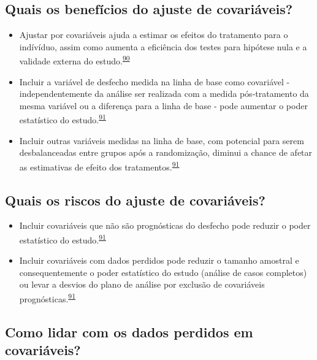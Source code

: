 \documentclass[
]{book}
\begin{document}
\hypertarget{quais-os-benefuxedcios-do-ajuste-de-covariuxe1veis}{%
\subsection{Quais os benefícios do ajuste de covariáveis?}\label{quais-os-benefuxedcios-do-ajuste-de-covariuxe1veis}}

\begin{itemize}
\item
  Ajustar por covariáveis ajuda a estimar os efeitos do tratamento para o indívíduo, assim como aumenta a eficiência dos testes para hipótese nula e a validade externa do estudo.\textsuperscript{\protect\hyperlink{ref-Hauck1998}{90}}
\item
  Incluir a variável de desfecho medida na linha de base como covariável - independentemente da análise ser realizada com a medida pós-tratamento da mesma variável ou a diferença para a linha de base - pode aumentar o poder estatístico do estudo.\textsuperscript{\protect\hyperlink{ref-Kahan2014}{91}}
\item
  Incluir outras variáveis medidas na linha de base, com potencial para serem desbalanceadas entre grupos após a randomização, diminui a chance de afetar as estimativas de efeito dos tratamentos.\textsuperscript{\protect\hyperlink{ref-Kahan2014}{91}}
\end{itemize}

\hypertarget{quais-os-riscos-do-ajuste-de-covariuxe1veis}{%
\subsection{Quais os riscos do ajuste de covariáveis?}\label{quais-os-riscos-do-ajuste-de-covariuxe1veis}}

\begin{itemize}
\item
  Incluir covariáveis que não são prognósticas do desfecho pode reduzir o poder estatístico do estudo.\textsuperscript{\protect\hyperlink{ref-Kahan2014}{91}}
\item
  Incluir covariáveis com dados perdidos pode reduzir o tamanho amostral e consequentemente o poder estatístico do estudo (análise de casos completos) ou levar a desvios do plano de análise por exclusão de covariáveis prognósticas.\textsuperscript{\protect\hyperlink{ref-Kahan2014}{91}}
\end{itemize}

\hypertarget{como-lidar-com-os-dados-perdidos-em-covariuxe1veis}{%
\subsection{Como lidar com os dados perdidos em covariáveis?}\label{como-lidar-com-os-dados-perdidos-em-covariuxe1veis}}
\end{document}
